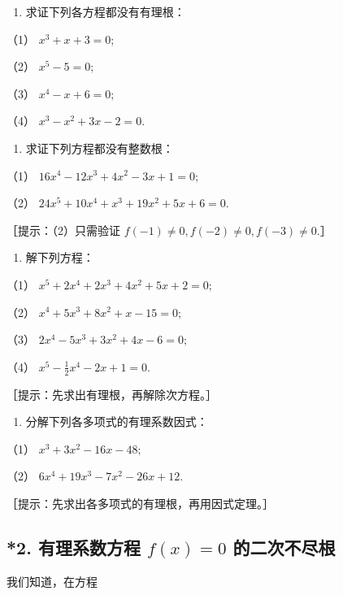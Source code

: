 \begin{enumerate}[start=2]
\item
  求证下列各方程都没有有理根：
\end{enumerate}

（1） \(x^{3} + x + 3 = 0;\)

（2） \(x^{5} - 5 = 0;\)

（3） \(x^{4} - x + 6 = 0;\)

（4） \(x^{3} - x^{2} + 3x - 2 = 0.\)

\begin{enumerate}[start=3]
\item
  求证下列方程都没有整数根：
\end{enumerate}

（1） \(16x^{4} - 12x^{3} + 4x^{2} - 3x + 1 = 0;\)

（2） \(24x^{5} + 10x^{4} + x^{3} + 19x^{2} + 5x + 6 = 0.\)

［提示：（2）只需验证 \(f(-1)\neq 0,f(-2)\neq 0,f(-3)\neq 0.\)］

\begin{enumerate}[start=4]
\item
  解下列方程：
\end{enumerate}

（1） \(x^{5} + 2x^{4} + 2x^{3} + 4x^{2} + 5x + 2 = 0;\)

（2） \(x^{4} + 5x^{3} + 8x^{2} + x - 15 = 0;\)

（3） \(2x^{4} - 5x^{3} + 3x^{2} + 4x - 6 = 0;\)

（4） \(x^{5} - \frac{1}{2} x^{4} - 2x + 1 = 0.\)

［提示：先求出有理根，再解除次方程。］

\begin{enumerate}[start=5]
\item
  分解下列各多项式的有理系数因式：
\end{enumerate}

（1） \(x^{3} + 3x^{2} - 16x - 48;\)

（2） \(6x^{4} + 19x^{3} - 7x^{2} - 26x + 12.\)

［提示：先求出各多项式的有理根，再用因式定理。］

\subsection{\texorpdfstring{*2. 有理系数方程 \(f(x) = 0\) 的二次不尽根}{*2. 有理系数方程 f(x) = 0 的二次不尽根}}

我们知道，在方程

